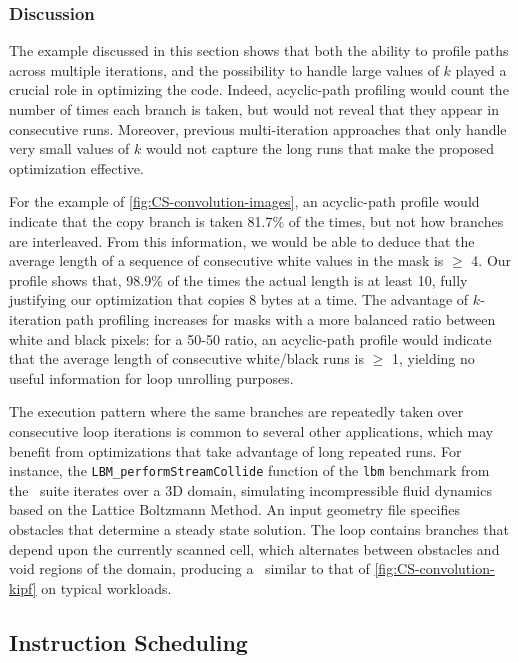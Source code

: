 \subsubsection*{Discussion}
The example discussed in this section shows that both the ability to profile paths across multiple iterations, and the possibility to handle large values of $k$ played a crucial role in optimizing the code. Indeed, acyclic-path profiling would count the number of times each branch is taken, but would not reveal that they appear in consecutive runs. Moreover, previous multi-iteration approaches that only handle very small values of $k$ would not capture the long runs that make the proposed optimization effective. 

For the example of \myfigure\ref{fig:CS-convolution-images}, an acyclic-path profile would indicate that the copy branch is taken 81.7\% of the times, but not how branches are interleaved. From this information, we would be able to deduce that the average length of a sequence of consecutive white values in the mask is $\ge$ 4. Our profile shows that, 98.9\% of the times the actual length is at least 10, fully justifying our optimization that copies 8 bytes at a time. The advantage of $k$-iteration path profiling increases for masks with a more balanced ratio between white and black pixels: for a 50-50 ratio, an acyclic-path profile would indicate that the average length of consecutive white/black runs is $\ge$ 1, yielding no useful information for loop unrolling purposes.

The execution pattern where the same branches are repeatedly taken over consecutive loop iterations is common to several other applications, which may benefit from optimizations that take advantage of long repeated runs. For instance, the {\tt LBM\_performStreamCollide} function of the {\tt lbm} benchmark from the \speccpu\ suite iterates over a 3D domain, simulating incompressible fluid dynamics based on the Lattice Boltzmann Method. An input geometry file specifies obstacles that determine a steady state solution. The loop contains branches that depend upon the currently scanned cell, which alternates between obstacles and void regions of the domain, producing a \kipf\ similar to that of \myfigure\ref{fig:CS-convolution-kipf} on typical workloads.

\subsection{Instruction Scheduling}
\label{ss:instr-scheduling}

